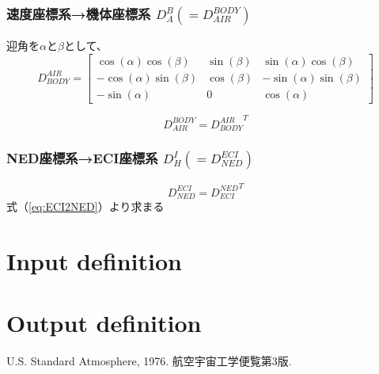 \documentclass[12pt]{jsarticle}
\begin{document}
\subsubsection{速度座標系→機体座標系 $D_{A}^{B} (= D_{AIR}^{BODY})$}

迎角を$\alpha$と$\beta$として、
\begin{equation}
  D_{BODY}^{AIR} = \left[
  \begin{array}{ccc}
    \cos(\alpha)\cos(\beta) & \sin(\beta) & \sin(\alpha)\cos(\beta) \\[2mm]
    -\cos(\alpha)\sin(\beta) & \cos(\beta) & -\sin(\alpha)\sin(\beta) \\[2mm]
    -\sin(\alpha) & 0 & \cos(\alpha)
  \end{array} \right]
\end{equation}

\begin{equation}
  D_{AIR}^{BODY} = {D_{BODY}^{AIR}}^T
\end{equation}

\subsubsection{NED座標系→ECI座標系 $D_{H}^{I} (= D_{NED}^{ECI})$}
\begin{equation}
  D_{NED}^{ECI} = {D_{ECI}^{NED}}^T
\end{equation}
式（\ref{eq:ECI2NED}）より求まる

\newpage
\section{Input definition}

\newpage
\section{Output definition}

\newpage
\begin{thebibliography}{9}
   U.S. Standard Atmosphere, 1976.
   航空宇宙工学便覧第3版.
\end{thebibliography}

\end{document}
